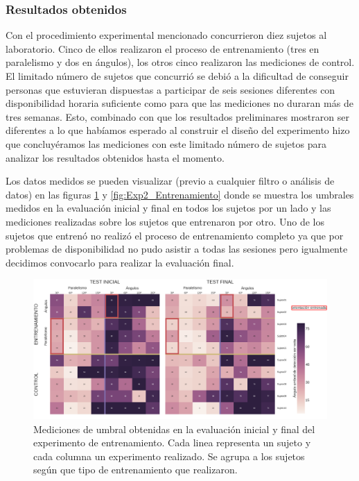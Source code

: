 \documentclass{article}
\numberwithin{figure}{section}
\begin{document}
    \subsubsection{Resultados obtenidos}
    
    Con el procedimiento experimental mencionado concurrieron diez sujetos al laboratorio. Cinco de ellos realizaron el proceso de entrenamiento (tres en paralelismo y dos en ángulos), los otros cinco realizaron las mediciones de control. El limitado número de sujetos que concurrió se debió a la dificultad de conseguir personas que estuvieran dispuestas a participar de seis sesiones diferentes con disponibilidad horaria suficiente como para que las mediciones no duraran más de tres semanas. Esto, combinado con que los resultados preliminares mostraron ser diferentes a lo que habíamos esperado al construir el diseño del experimento hizo que concluyéramos las mediciones con este limitado número de sujetos para analizar los resultados obtenidos hasta el momento.
    
    Los datos medidos se pueden visualizar (previo a cualquier filtro o análisis de datos) en las figuras \ref{fig:Exp2_Test} y \ref{fig:Exp2_Entrenamiento} donde se muestra los umbrales medidos en la evaluación inicial y final en todos los sujetos por un lado y las mediciones realizadas sobre los sujetos que entrenaron por otro. Uno de los sujetos que entrenó no realizó el proceso de entrenamiento completo ya que por problemas de disponibilidad no pudo asistir a todas las sesiones pero igualmente decidimos convocarlo para realizar la evaluación final. 

                                                    
    \begin{figure}
        \center
        \includegraphics[width=\textwidth]{Imagenes/TransferenciaHeatmap.png}
        \caption{Mediciones de umbral obtenidas en la evaluación inicial y final del experimento de entrenamiento. Cada linea representa un sujeto y cada columna un experimento realizado. Se agrupa a los sujetos según que tipo de entrenamiento que realizaron.}
        \label{fig:Exp2_Test}
    \end{figure}  
    
\end{document}
